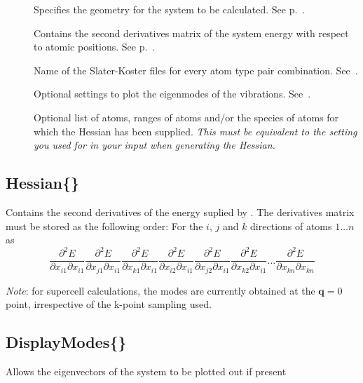 \begin{description}
\item[] Specifies the geometry for the system to be
  calculated.  See p.~.
\item[] Contains the second derivatives matrix of the
  system energy with respect to atomic positions. See
  p.~.
\item[] Name of the Slater-Koster files for
  every atom type pair combination. See~.
\item[] Optional settings to plot the eigenmodes of
  the vibrations. See~.
\item[] Optional list of atoms, ranges of atoms and/or the
  species of atoms for which the Hessian has been supplied. \emph{This must be
  equivalent to the setting you used for  in your \dftbp{} input
  when generating the Hessian.}
\end{description}


\subsection{Hessian\{\}}
\label{sec:modes.Hessian}

Contains the second derivatives of the energy suplied
by {\dftbp}. The derivatives matrix must be stored as the following
order: For the $i$, $j$ and $k$ directions of atoms $1 \ldots n$
as $$\frac{\partial^2 E}{\partial x_{i1} \partial x_{i1}}
\frac{\partial^2 E}{\partial x_{j1} \partial x_{i1}} \frac{\partial^2
  E}{\partial x_{k1} \partial x_{i1}} \frac{\partial^2 E}{\partial
  x_{i2} \partial x_{i1}} \frac{\partial^2 E}{\partial x_{j2} \partial
  x_{i1}} \frac{\partial^2 E}{\partial x_{k2} \partial x_{i1}} \ldots
\frac{\partial^2 E}{\partial x_{kn} \partial x_{kn}}$$

{\em Note}: for supercell calculations, the modes are currently
obtained at the $\mathbf{q}=0$ point, irrespective of the k-point
sampling used.


\subsection{DisplayModes\{\}}
\label{sec:modes.DisplayModes}

Allows the eigenvectors of the system to be plotted out if present

